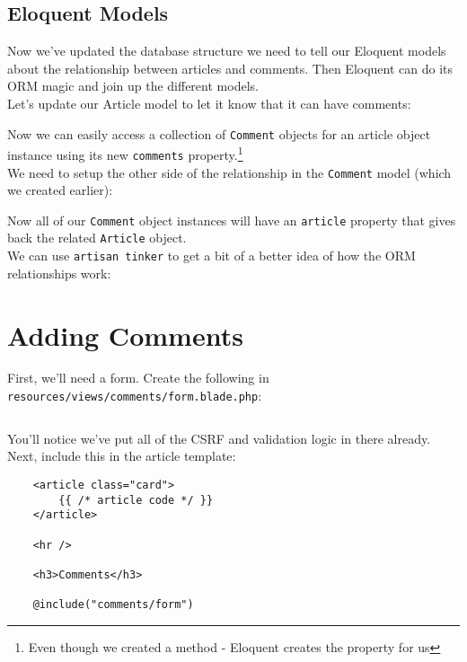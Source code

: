 \subsection{Eloquent Models}

Now we've updated the database structure we need to tell our Eloquent models about the relationship between articles and comments. Then Eloquent can do its ORM magic and join up the different models.
\\

Let's update our Article model to let it know that it can have comments:


Now we can easily access a collection of \texttt{Comment} objects for an article object instance using its new \texttt{comments} property.\footnote{Even though we created a method - Eloquent creates the property for us}
\\

We need to setup the other side of the relationship in the \texttt{Comment} model (which we created earlier):


Now all of our \texttt{Comment} object instances will have an \texttt{article} property that gives back the related \texttt{Article} object.
\\

We can use \texttt{artisan tinker} to get a bit of a better idea of how the ORM relationships work:



\section{Adding Comments}

First, we'll need a form. Create the following in \\ \texttt{resources/views/comments/form.blade.php}:

\inputminted{html}{10-one-to-many/figures/comments-form.blade.php}

You'll notice we've put all of the CSRF and validation logic in there already.
\\

Next, include this in the article template:

\begin{verbatim}
    <article class="card">
        {{ /* article code */ }}
    </article>

    <hr />

    <h3>Comments</h3>

    @include("comments/form")
\end{verbatim}

